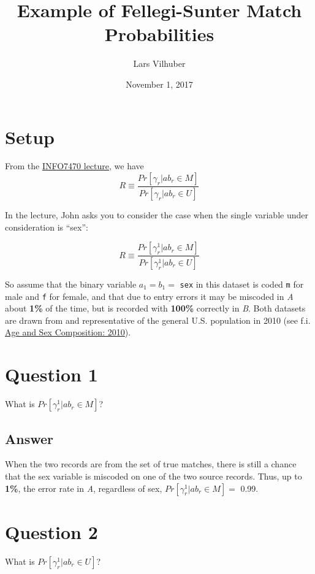 \documentclass[]{article}
\title{Example of Fellegi-Sunter Match Probabilities}
\author{Lars Vilhuber}
\date{November 1, 2017}
\begin{document}
\maketitle

\section{Setup}\label{setup}

From the \href{https://www.vrdc.cornell.edu/info747x}{INFO7470 lecture},
we have \[
R \equiv \frac{Pr [ \gamma_r | ab_r \in M]}{Pr[ \gamma_r | ab_r \in U]}
\]

In the lecture, John asks you to consider the case when the single
variable under consideration is ``sex'':

\[
R \equiv \frac{Pr [ \gamma^1_r | ab_r \in M]}{Pr[ \gamma^1_r | ab_r \in U]}
\]

So assume that the binary variable \(a_1 = b_1 =\) \texttt{sex} in this
dataset is coded \texttt{m} for male and \texttt{f} for female, and that
due to entry errors it may be miscoded in \emph{A} about \textbf{1\%} of
the time, but is recorded with \textbf{100\%} correctly in \emph{B}.
Both datasets are drawn from and representative of the general U.S.
population in 2010 (see f.i.
\href{https://www.census.gov/prod/cen2010/briefs/c2010br-03.pdf}{Age and
Sex Composition: 2010}).

\section{Question 1}\label{question-1}

What is \(Pr [ \gamma^1_r | ab_r \in M]\)?

\subsection{Answer}\label{answer}

When the two records are from the set of true matches, there is still a
chance that the sex variable is miscoded on one of the two source
records. Thus, up to \textbf{1\%}, the error rate in \emph{A},
regardless of sex, \(Pr [ \gamma^1_r | ab_r \in M] =\) 0.99.

\section{Question 2}\label{question-2}

What is \(Pr [ \gamma^1_r | ab_r \in U]\)?
\end{document}
